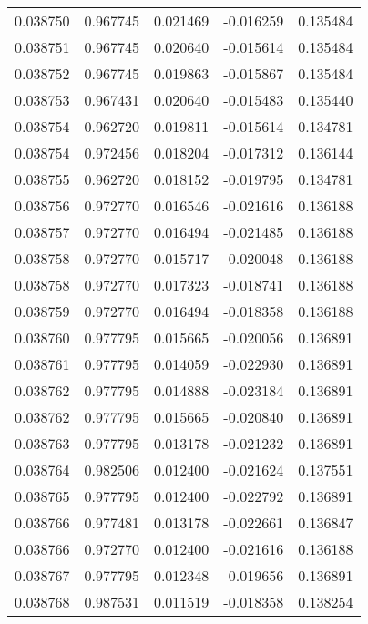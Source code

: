 \begin{tabular}{lrrrr}
0.038750    &  0.967745 &  0.021469 & -0.016259 &             0.135484 \\
0.038751    &  0.967745 &  0.020640 & -0.015614 &             0.135484 \\
0.038752    &  0.967745 &  0.019863 & -0.015867 &             0.135484 \\
0.038753    &  0.967431 &  0.020640 & -0.015483 &             0.135440 \\
0.038754    &  0.962720 &  0.019811 & -0.015614 &             0.134781 \\
0.038754    &  0.972456 &  0.018204 & -0.017312 &             0.136144 \\
0.038755    &  0.962720 &  0.018152 & -0.019795 &             0.134781 \\
0.038756    &  0.972770 &  0.016546 & -0.021616 &             0.136188 \\
0.038757    &  0.972770 &  0.016494 & -0.021485 &             0.136188 \\
0.038758    &  0.972770 &  0.015717 & -0.020048 &             0.136188 \\
0.038758    &  0.972770 &  0.017323 & -0.018741 &             0.136188 \\
0.038759    &  0.972770 &  0.016494 & -0.018358 &             0.136188 \\
0.038760    &  0.977795 &  0.015665 & -0.020056 &             0.136891 \\
0.038761    &  0.977795 &  0.014059 & -0.022930 &             0.136891 \\
0.038762    &  0.977795 &  0.014888 & -0.023184 &             0.136891 \\
0.038762    &  0.977795 &  0.015665 & -0.020840 &             0.136891 \\
0.038763    &  0.977795 &  0.013178 & -0.021232 &             0.136891 \\
0.038764    &  0.982506 &  0.012400 & -0.021624 &             0.137551 \\
0.038765    &  0.977795 &  0.012400 & -0.022792 &             0.136891 \\
0.038766    &  0.977481 &  0.013178 & -0.022661 &             0.136847 \\
0.038766    &  0.972770 &  0.012400 & -0.021616 &             0.136188 \\
0.038767    &  0.977795 &  0.012348 & -0.019656 &             0.136891 \\
0.038768    &  0.987531 &  0.011519 & -0.018358 &             0.138254 \\

\end{tabular}
